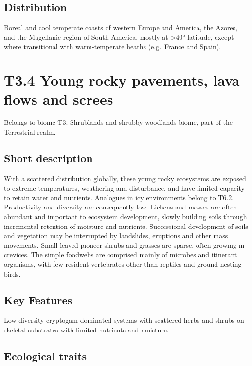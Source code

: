 \documentclass[
  letterpaper,
  DIV=11,
  numbers=noendperiod]{scrartcl}
\begin{document}
\subsection{Distribution}\label{distribution-81}

Boreal and cool temperate coasts of western Europe and America, the
Azores, and the Magellanic region of South America, mostly at
\textgreater40° latitude, except where transitional with warm-temperate
heaths (e.g.~France and Spain).

\section{T3.4 Young rocky pavements, lava flows and
screes}\label{t3.4-young-rocky-pavements-lava-flows-and-screes}

Belongs to biome T3. Shrublands and shrubby woodlands biome, part of the
Terrestrial realm.

\subsection{Short description}\label{short-description-82}

With a scattered distribution globally, these young rocky ecosystems are
exposed to extreme temperatures, weathering and disturbance, and have
limited capacity to retain water and nutrients. Analogues in icy
environments belong to T6.2. Productivity and diversity are consequently
low. Lichens and mosses are often abundant and important to ecosystem
development, slowly building soils through incremental retention of
moisture and nutrients. Successional development of soils and vegetation
may be interrupted by landslides, eruptions and other mass movements.
Small-leaved pioneer shrubs and grasses are sparse, often growing in
crevices. The simple foodwebs are comprised mainly of microbes and
itinerant organisms, with few resident vertebrates other than reptiles
and ground-nesting birds.

\subsection{Key Features}\label{key-features-82}

Low-diversity cryptogam-dominated systems with scattered herbs and
shrubs on skeletal substrates with limited nutrients and moisture.

\subsection{Ecological traits}\label{ecological-traits-82}
\end{document}
